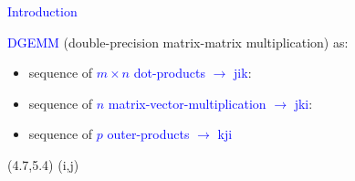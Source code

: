 \documentclass[11pt]{beamer}
\begin{document}
\begin{frame}[fragile]{\textcolor{blue}{Introduction}}

\textcolor{blue}{DGEMM} (double-precision matrix-matrix multiplication) as:
\begin{itemize}
\item sequence of \textcolor{blue}{$m \times n$ dot-products $\rightarrow$ jik}:

\begin{small}
\begin{figure}
    \def\svgwidth{0.7\columnwidth}
    
\end{figure}
\end{small}

\item sequence of \textcolor{blue}{$n$ matrix-vector-multiplication $\rightarrow$ jki}:
\begin{small}
\begin{figure}
    \def\svgwidth{0.7\columnwidth}
    
\end{figure}
\end{small}

\item sequence of \textcolor{blue}{$p$ outer-products $\rightarrow$ kji}
\end{itemize}

\begin{textblock}{5}(4.7,5.4)
{\tiny (i,j)}
\end{textblock}

\end{frame}
\end{document}
